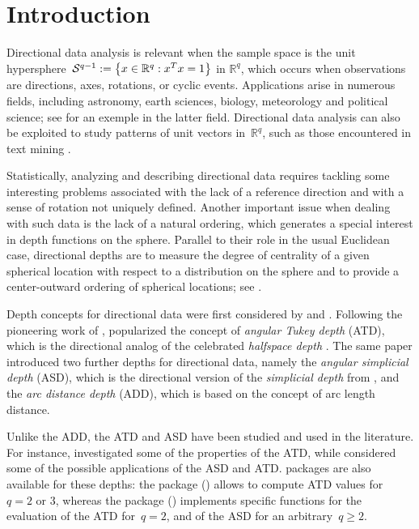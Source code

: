 \documentclass[usenames,dvipsnames]{article}
\begin{document}


\section{Introduction}

Directional data analysis is relevant when the sample space is the unit hypersphere~$\mathcal{S}^{q-1}\linebreak :=\left\{x \in \mathbb{R}^{q}:x^{T}x = 1\right\}$ in $\mathbb{R}^{q}$, which occurs when observations are directions, axes, rotations, or cyclic events. Applications arise in numerous fields, including astronomy, earth sciences, biology, meteorology and political science; see \cite{GiHa2010} for an exemple in the latter field. Directional data analysis can also be exploited to study patterns of unit vectors in~$\mathbb{R}^{q}$, such as those encountered in text mining \citep{Hoetal2012}.

Statistically, analyzing and describing directional data requires tackling some interesting problems associated with the lack of a reference direction and with a sense of rotation not uniquely defined. Another important issue when dealing with such data is the lack of a natural ordering, which generates a special interest in depth functions on the sphere. Parallel to their role in the usual Euclidean case, directional depths are to measure the degree of centrality of a given spherical location with respect to a distribution on the sphere and to provide a center-outward ordering of spherical locations; see \cite{AgoRom2013a}.  

Depth concepts for directional data were first considered by \cite{Sma1987} and \cite{LiuSin1992}. Following the pioneering work of \cite{Sma1987}, \cite{LiuSin1992} popularized the concept of \textit{angular Tukey depth} (ATD), which is the directional analog of the celebrated \emph{halfspace depth} \citep{Tuk1975}. The same paper introduced two further depths for directional data, namely the \textit{angular simplicial depth} (ASD), which is the directional version of the \emph{simplicial depth} from \cite{Liu1990}, and the \emph{arc distance depth} (ADD), which is based on the concept of arc length distance. 

Unlike the ADD, the ATD and ASD have been studied and used in the literature. For instance, \cite{RouStr2004} investigated some of the properties of the ATD, while \cite{AgoRom2013a} considered some of the possible applications of the ASD and ATD. {} packages are also available for these depths: the package {} (\citealp{Genetal2012}) allows to compute ATD values for~$q = 2$ or $3$, whereas the package {} (\citealp{AgoRom2013b}) implements specific functions for the evaluation of the ATD for~$q=2$, and of the ASD for an arbitrary~$q\geq 2$. 
\end{document}
